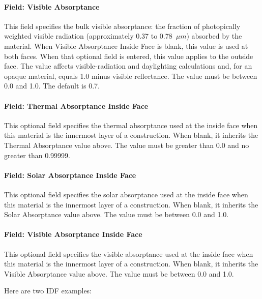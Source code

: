 \paragraph{Field: Visible Absorptance}\label{field-visible-absorptance}

This field specifies the bulk visible absorptance: the fraction of photopically weighted visible radiation (approximately 0.37 to 0.78~$\mu{}m$) absorbed by the material. When Visible Absorptance Inside Face is blank, this value is used at both faces. When that optional field is entered, this value applies to the outside face. The value affects visible-radiation and daylighting calculations and, for an opaque material, equals 1.0 minus visible reflectance. The value must be between 0.0 and 1.0. The default is 0.7.

\paragraph{Field: Thermal Absorptance Inside Face}\label{field-thermal-absorptance-inside-face}

This optional field specifies the thermal absorptance used at the inside face when this material is the innermost layer of a construction. When blank, it inherits the Thermal Absorptance value above. The value must be greater than 0.0 and no greater than 0.99999.

\paragraph{Field: Solar Absorptance Inside Face}\label{field-solar-absorptance-inside-face}

This optional field specifies the solar absorptance used at the inside face when this material is the innermost layer of a construction. When blank, it inherits the Solar Absorptance value above. The value must be between 0.0 and 1.0.

\paragraph{Field: Visible Absorptance Inside Face}\label{field-visible-absorptance-inside-face}

This optional field specifies the visible absorptance used at the inside face when this material is the innermost layer of a construction. When blank, it inherits the Visible Absorptance value above. The value must be between 0.0 and 1.0.

Here are two IDF examples:

